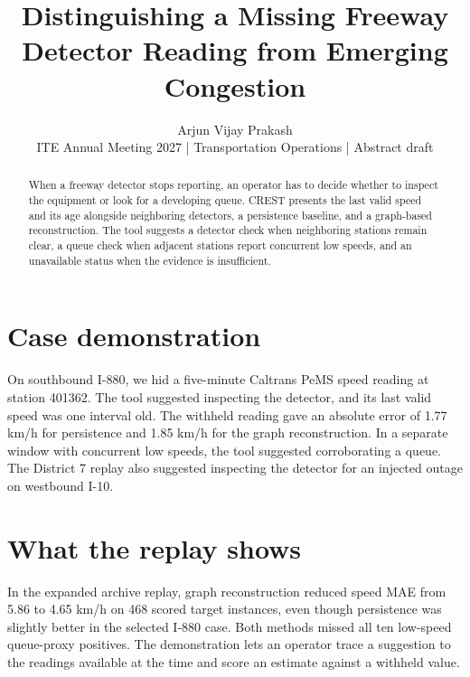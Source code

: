 \documentclass[10pt,letterpaper]{article}
\date{}
\title{Distinguishing a Missing Freeway Detector Reading from Emerging Congestion}
\author{Arjun Vijay Prakash \\ \small ITE Annual Meeting 2027 | Transportation Operations |
Abstract draft}
\begin{document}
\maketitle
\begin{abstract}
When a freeway detector stops reporting, an operator has to decide whether to inspect the
equipment or look for a developing queue. CREST presents the last valid speed and its age
alongside neighboring detectors, a persistence baseline, and a graph-based reconstruction. The
tool suggests a detector check when neighboring stations remain clear, a queue check when
adjacent stations report concurrent low speeds, and an unavailable status when the evidence is
insufficient.
\end{abstract}

\section*{Case demonstration}
On southbound I-880, we hid a five-minute Caltrans PeMS speed reading at station 401362. The
tool suggested inspecting the detector, and its last valid speed was one interval old. The
withheld reading gave an absolute error of 1.77 km/h for persistence and 1.85 km/h for the graph
reconstruction. In a separate window with concurrent low speeds, the tool suggested
corroborating a queue. The District 7 replay also suggested inspecting the detector for an
injected outage on westbound I-10.

\section*{What the replay shows}
In the expanded archive replay, graph reconstruction reduced speed MAE from 5.86 to
4.65 km/h on 468 scored target instances, even though persistence was slightly better
in the selected I-880 case. Both methods missed all ten low-speed queue-proxy positives.
The demonstration lets an operator trace a suggestion to the readings available at the
time and score an estimate against a withheld value.
\end{document}
